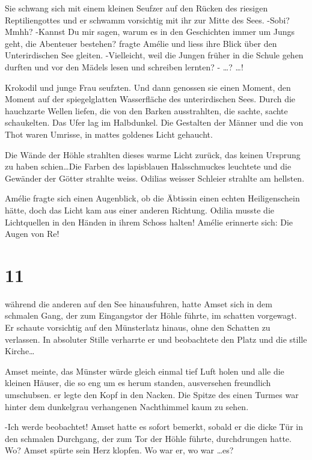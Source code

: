 Sie schwang sich mit einem kleinen Seufzer auf den Rücken des riesigen Reptiliengottes und er schwamm vorsichtig mit ihr zur Mitte des Sees. -Sobi? Mmhh? -Kannst Du mir sagen, warum es in den Geschichten immer um Jungs geht, die Abenteuer bestehen? fragte Amélie und liess ihre Blick über den Unterirdischen See gleiten. -Vielleicht, weil die Jungen früher in die Schule gehen durften und vor den Mädels lesen und schreiben lernten? - \dots ? \dots !

Krokodil und junge Frau seufzten. Und dann genossen sie einen Moment, den Moment auf der spiegelglatten Wasserfläche des unterirdischen Sees. Durch die hauchzarte Wellen liefen, die von den Barken ausstrahlten, die sachte, sachte schaukelten. Das Ufer lag im Halbdunkel. Die Gestalten der Männer und die von Thot waren Umrisse, in mattes goldenes Licht gehaucht.

Die Wände der Höhle strahlten dieses warme Licht zurück, das keinen Ursprung zu haben schien\dots Die Farben des lapisblauen Halsschmuckes leuchtete und die Gewänder der Götter strahlte weiss. Odilias weisser Schleier strahlte am hellsten. 

Amélie fragte sich einen Augenblick, ob die Äbtissin einen echten Heiligenschein hätte, doch das Licht kam aus einer anderen Richtung. Odilia musste die Lichtquellen in den Händen in ihrem Schoss halten!
Amélie erinnerte sich: Die Augen von Re!

\section*{11}

während die anderen auf den See hinausfuhren, hatte Amset sich in dem schmalen Gang, der zum Eingangstor der Höhle führte, im schatten vorgewagt. Er schaute vorsichtig auf den Münsterlatz hinaus, ohne den Schatten zu verlassen. In absoluter Stille verharrte er und beobachtete den Platz und die stille Kirche\dots

Amset meinte, das Münster würde gleich einmal tief Luft holen und alle die kleinen Häuser, die so eng um es herum standen, ausversehen freundlich umschubsen. er legte den Kopf in den Nacken. Die Spitze des einen Turmes war hinter dem dunkelgrau verhangenen Nachthimmel kaum zu sehen. 

-Ich werde beobachtet! Amset hatte es sofort bemerkt, sobald er die dicke Tür in den schmalen Durchgang, der zum Tor der Höhle führte, durchdrungen hatte. Wo? Amset spürte sein Herz klopfen. Wo war er, wo war \dots es?

